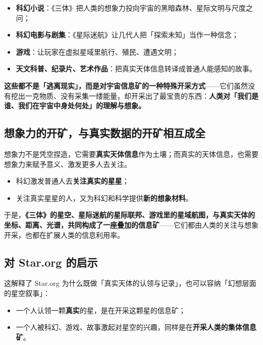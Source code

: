\documentclass[11pt,fontset=none]{ctexart}
\begin{document}
\begin{itemize}
  \item \textbf{科幻小说}：《三体》把人类的想象力投向宇宙的黑暗森林、星际文明与尺度之问；
  \item \textbf{科幻电影与剧集}：《星际迷航》让几代人把「探索未知」当作一种信念；
  \item \textbf{游戏}：让玩家在虚拟星域里航行、殖民、遭遇文明；
  \item \textbf{天文科普、纪录片、艺术作品}：把真实天体信息转译成普通人能感知的故事。
\end{itemize}

\textbf{这些都不是「逃离现实」，而是对宇宙信息矿的一种特殊开采方式}——它们虽然没有挖出一克物质、没有采集一缕能量，却开采出了最宝贵的东西：\textbf{人类对「我们是谁、我们在宇宙中身处何处」的理解与想象。}

\subsection{想象力的开矿，与真实数据的开矿相互成全}

想象力不是凭空捏造，它需要\textbf{真实天体信息}作为土壤；而真实的天体信息，也需要想象力来赋予意义、激发更多人去关注。

\begin{itemize}
  \item 科幻激发普通人去\textbf{关注真实的星星}；
  \item 关注真实星星的人，又为科幻和科学提供\textbf{新的想象材料}。
\end{itemize}

于是，\textbf{《三体》的星空、星际迷航的星际联邦、游戏里的星域航图，与真实天体的坐标、距离、光谱，共同构成了一座叠加的信息矿}——它们都由人类的关注与想象开采，也都在扩展人类的信息利用率。

\subsection{对 Star.org 的启示}

这解释了 Star.org 为什么既做「真实天体的认领与记录」，也可以容纳「幻想层面的星空叙事」：

\begin{itemize}
  \item 一个人认领一颗\textbf{真实}的星，是在开采这颗星的信息矿；
  \item 一个人被科幻、游戏、故事激起对星空的兴趣，同样是在\textbf{开采人类的集体信息矿}。
\end{itemize}
\end{document}
